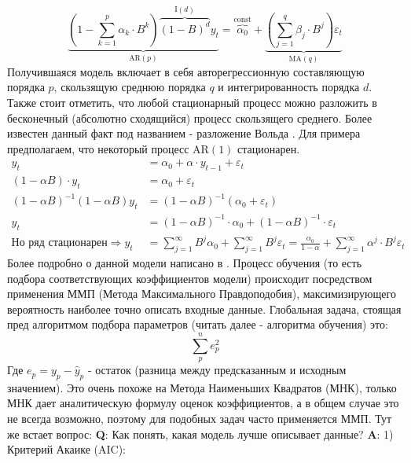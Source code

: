 	\begin{equation}
		\underbrace{\left(1 - \sum_{k = 1}^{p} \alpha_k \cdot B^k\right) \overbrace{(1 - B)^d}^{\text{I}(d)} y_t}_{\text{AR}(p)} = \overbrace{\alpha_0}^{\text{const}} + \underbrace{\left(\sum_{j = 1}^{q} \beta_j \cdot B^j\right) \varepsilon_{t}}_{\text{MA}(q)}
	\end{equation}
	Получившаяся модель включает в себя авторегрессионную составляющую порядка $p$, скользящую среднюю порядка $q$ и интегрированность порядка $d$. Также стоит отметить, что любой стационарный процесс можно разложить в бесконечный (абсолютно сходящийся) процесс скользящего среднего. Более известен данный факт под названием - разложение Вольда \cite{wold_decomposition}. Для примера предполагаем, что некоторый процесс AR$(1)$ стационарен.
	\begin{equation}
		\begin{split}
			y_t & = \alpha_ 0 + \alpha \cdot y_{t - 1} + \varepsilon_{t}\\
			(1 - \alpha B) \cdot y_t & = \alpha_0 + \varepsilon_{t}\\
			(1 - \alpha B)^{-1}(1 - \alpha B) y_t & = (1 - \alpha B)^{-1} (\alpha_0 + \varepsilon_{t})\\
			y_t & = (1 - \alpha B)^{-1} \cdot \alpha_0 + (1 - \alpha B)^{-1} \cdot \varepsilon_{t}\\
			\text{Но ряд стационарен} \Rightarrow y_t & = \sum_{j = 1}^{\infty} B^j\alpha_0 + \sum_{j = 1}^{\infty} B^j\varepsilon_{t} = \frac{\alpha_0}{1 - \alpha} + \sum_{j = 1}^{\infty} \alpha^j \cdot B^j\varepsilon_{t}
		\end{split}
	\end{equation}
	Более подробно о данной модели написано в \cite{arima}. Процесс обучения (то есть подбора соответствующих коэффициентов модели) происходит посредством применения ММП (Метода Максимального Правдоподобия), максимизирующего вероятность наиболее точно описать входные данные. Глобальная задача, стоящая пред алгоритмом подбора параметров (читать далее - алгоритма обучения) это:
	\begin{equation}
		\sum_{p}^n e_p^2
	\end{equation}
	Где $e_p = y_p - \hat{y}_p$ - остаток (разница между предсказанным и исходным значением). Это очень похоже на Метода Наименьших Квадратов (МНК), только МНК дает аналитическую формулу оценок коэффициентов, а в общем случае это не всегда возможно, поэтому для подобных задач часто применяется ММП. Тут же встает вопрос: \textbf{Q}: Как понять, какая модель лучше описывает данные? \textbf{A}: 1) Критерий Акаике (AIC):
